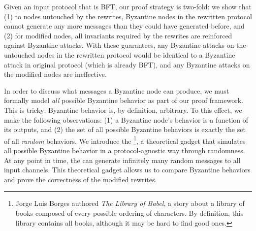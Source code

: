 Given an input protocol that is BFT, our proof strategy is two-fold: we show that (1) to nodes untouched by the rewrites, Byzantine nodes in the rewritten protocol cannot generate any more messages than they could have generated before, and
(2) for modified nodes, all invariants required by the rewrites are reinforced against Byzantine attacks.
With these guarantees, any Byzantine attacks on the untouched nodes in the rewritten protocol would be identical to a Byzantine attack in original protocol (which is already BFT), and any Byzantine attacks on the modified nodes are ineffective.

In order to discuss what messages a Byzantine node can produce, we must formally model \emph{all} possible Byzantine behavior as part of our proof framework.
This is tricky: Byzantine behavior is, by definition, arbitrary.
To this effect, we make the following observations: (1) a Byzantine node's behavior is a function of its outputs, and (2) the set of all possible Byzantine behaviors is  exactly the set of all \emph{random} behaviors.
We introduce the \emph{\randomSimulator{}}\footnote{Jorge Luis Borges authored \textit{The Library of Babel}, a story about a library of books composed of every possible ordering of characters. By definition, this library contains all books, although it may be hard to find good ones.}, a theoretical gadget that simulates all possible Byzantine behavior in a protocol-agnostic way through randomness.
At any point in time, the \randomSimulator{} can generate infinitely many random messages to all input channels.
This theoretical gadget allows us to compare Byzantine behaviors and prove the correctness of the modified rewrites.


